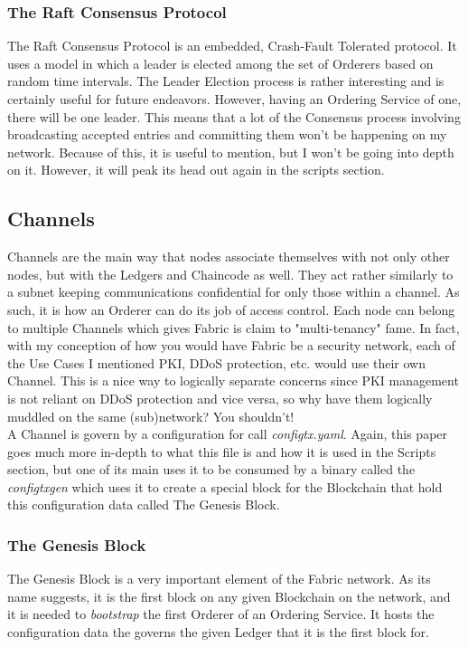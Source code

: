 		\subsubsection{The Raft Consensus Protocol}
			\hspace{10mm}The Raft Consensus Protocol is an embedded, Crash-Fault Tolerated protocol. It uses a model in which a leader is elected among the set of Orderers based on random time intervals. The Leader Election process is rather interesting and is certainly useful for future endeavors. However, having an Ordering Service of one, there will be one leader. This means that a lot of the Consensus process involving broadcasting accepted entries and committing them won't be happening on my network. Because of this, it is useful to mention, but I won't be going into depth on it. However, it will peak its head out again in the scripts section.\\
			
	\subsection{Channels}
		\hspace{10mm} Channels are the main way that nodes associate themselves with not only other nodes, but with the Ledgers and Chaincode as well. They act rather similarly to a subnet keeping communications confidential for only those within a channel. As such, it is how an Orderer can do its job of access control. Each node can belong to multiple Channels which gives Fabric is claim to "multi-tenancy" fame. In fact, with my conception of how you would have Fabric be a security network, each of the Use Cases I mentioned PKI, DDoS protection, etc. would use their own Channel. This is a nice way to logically separate concerns since PKI management is not reliant on DDoS protection and vice versa, so why have them logically muddled on the same (sub)network? You shouldn't!\\
		
		\hspace{10mm}A Channel is govern by a configuration for call \textit{configtx.yaml}. Again, this paper goes much more in-depth to what this file is and how it is used in the Scripts section, but one of its main uses it to be consumed by a binary called the \textit{configtxgen} which uses it to create a special block for the Blockchain that hold this configuration data called The Genesis Block.\\
		
		\subsubsection{The Genesis Block}
			\hspace{10mm}The Genesis Block is a very important element of the Fabric network. As its name suggests, it is the first block on any given Blockchain on the network, and it is needed to \textit{bootstrap} the first Orderer of an Ordering Service. It hosts the configuration data the governs the given Ledger that it is the first block for.\\
			
